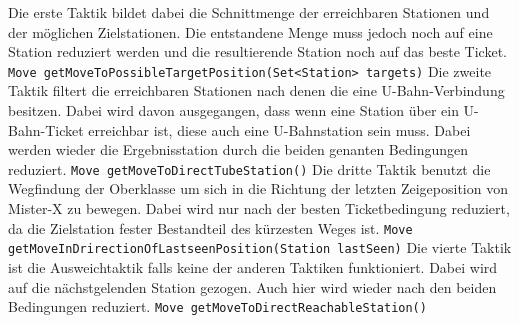                     Die erste Taktik bildet dabei die Schnittmenge der erreichbaren Stationen und der möglichen Zielstationen.
                    Die entstandene Menge muss jedoch noch auf eine Station reduziert werden und die resultierende Station noch auf das beste Ticket.
                    \newline
                    \newline
                    \texttt{Move getMoveToPossibleTargetPosition(Set<Station> targets)}
                    \newline
                    \newline
                    Die zweite Taktik filtert die erreichbaren Stationen nach denen die eine U-Bahn-Verbindung besitzen.
                    Dabei wird davon ausgegangen, dass wenn eine Station über ein U-Bahn-Ticket erreichbar ist, diese auch eine U-Bahnstation sein muss.
                    Dabei werden wieder die Ergebnisstation durch die beiden genanten Bedingungen reduziert.
                    \newline
                    \newline
                    \texttt{Move getMoveToDirectTubeStation()}
                    \newline
                    \newline
                    Die dritte Taktik benutzt die Wegfindung der Oberklasse um sich in die Richtung der letzten Zeigeposition von Mister-X zu bewegen.
                    Dabei wird nur nach der besten Ticketbedingung reduziert, da die Zielstation fester Bestandteil des kürzesten Weges ist.
                    \newline
                    \newline
                    \texttt{Move getMoveInDrirectionOfLastseenPosition(Station lastSeen)}
                    \newline
                    \newline
                    Die vierte Taktik ist die Ausweichtaktik falls keine der anderen Taktiken funktioniert.
                    Dabei wird auf die nächstgelenden Station gezogen.
                    Auch hier wird wieder nach den beiden Bedingungen reduziert.
                    \newline
                    \newline
                    \texttt{Move getMoveToDirectReachableStation()}
                    \newline
                    \newline
